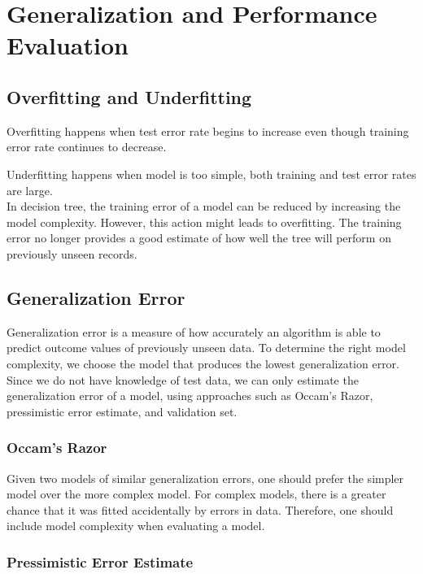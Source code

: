 \chapter{Generalization and Performance Evaluation}

\begin{multicols*}{2}

\section{Overfitting and Underfitting}

\noindent Overfitting happens when test error rate begins to increase even though training error rate continues to decrease.

\noindent Underfitting happens when model is too simple, both training and test error rates are large. \\

\noindent In decision tree, the training error of a model can be reduced by increasing the model complexity. However, this action might leads to overfitting. The training error no longer provides a good estimate of how well the tree will perform on previously unseen records.

\section{Generalization Error}

\noindent Generalization error is a measure of how accurately an algorithm is able to predict outcome values of previously unseen data. To determine the right model complexity, we choose the model that produces the lowest generalization error. Since we do not have knowledge of test data, we can only estimate the generalization error of a model, using approaches such as Occam's Razor, pressimistic error estimate, and validation set. \\

\subsection{Occam's Razor}

Given two models of similar generalization errors, one should prefer the simpler model over the more complex model. For complex models, there is a greater chance that it was fitted accidentally by errors in data. Therefore, one should include model complexity when evaluating a model. 

\subsection{Pressimistic Error Estimate}


\end{multicols*}
